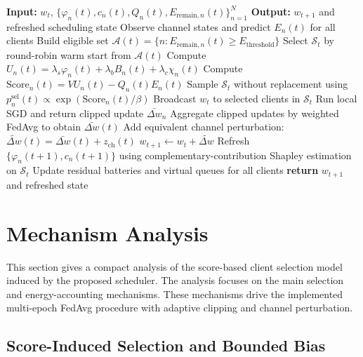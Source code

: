 \documentclass[journal]{IEEEtran}
\begin{document}
\begin{algorithm}
\caption{One Round of the Proposed Scheduler}
\label{alg:round}
\begin{algorithmic}[1]
\STATE \textbf{Input:} $w_t$, $\{\varphi_n(t),c_n(t),Q_n(t),E_{\mathrm{remain},n}(t)\}_{n=1}^N$
\STATE \textbf{Output:} $w_{t+1}$ and refreshed scheduling state
\STATE Observe channel states and predict $E_n(t)$ for all clients
\STATE Build eligible set $\mathcal{A}(t)=\{n:E_{\mathrm{remain},n}(t)\geq E_{\mathrm{threshold}}\}$
    \STATE Select $\mathcal{S}_t$ by round-robin warm start from $\mathcal{A}(t)$
\ELSE
        \STATE Compute $U_n(t)=\lambda_s\varphi_n(t)+\lambda_bB_n(t)+\lambda_c\chi_n(t)$
        \STATE Compute $\mathrm{Score}_n(t)=VU_n(t)-Q_n(t)E_n(t)$
    \ENDFOR
    \STATE Sample $\mathcal{S}_t$ without replacement using $p_n^{\mathrm{sel}}(t)\propto \exp(\mathrm{Score}_n(t)/\beta)$
\ENDIF
\STATE Broadcast $w_t$ to selected clients in $\mathcal{S}_t$
    \STATE Run local SGD and return clipped update $\bar{\Delta w}_n$
\ENDFOR
\STATE Aggregate clipped updates by weighted FedAvg to obtain $\bar{\Delta w}(t)$
\STATE Add equivalent channel perturbation: $\tilde{\Delta w}(t)=\bar{\Delta w}(t)+z_{\mathrm{ch}}(t)$
\STATE $w_{t+1} \leftarrow w_t+\tilde{\Delta w}$
\STATE Refresh $\{\varphi_n(t+1),c_n(t+1)\}$ using complementary-contribution Shapley estimation on $\mathcal{S}_t$
\STATE Update residual batteries and virtual queues for all clients
\STATE \textbf{return} $w_{t+1}$ and refreshed state
\end{algorithmic}
\end{algorithm}

\section{Mechanism Analysis}
\label{sec:analysis}

This section gives a compact analysis of the score-based client selection model induced by the proposed scheduler. The analysis focuses on the main selection and energy-accounting mechanisms. These mechanisms drive the implemented multi-epoch FedAvg procedure with adaptive clipping and channel perturbation.

\subsection{Score-Induced Selection and Bounded Bias}
\end{document}
